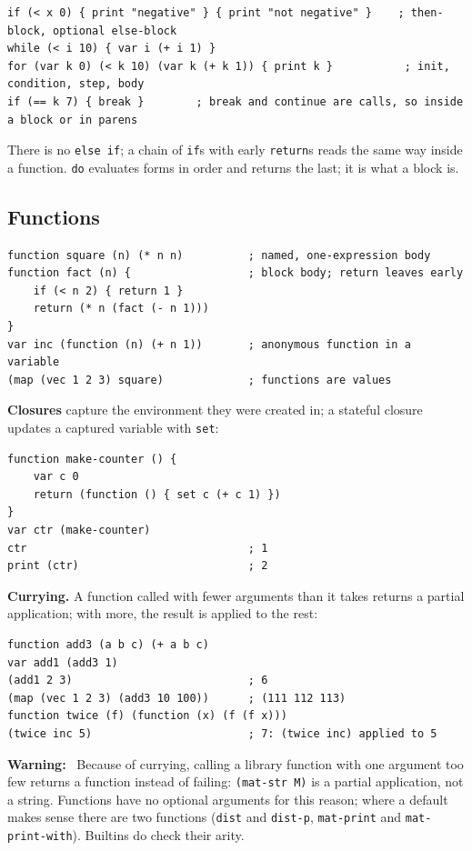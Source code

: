 \documentclass[11pt,a4paper]{article}
\newcommand{\musil}[1]{\lstinline[style=musilinline]{#1}}
\newenvironment{warn}{\begin{mdframed}[backgroundcolor=red!6,linecolor=musilred,linewidth=0.8pt]\textbf{Warning:}\ }{\end{mdframed}}
\begin{document}
\begin{lstlisting}
if (< x 0) { print "negative" } { print "not negative" }    ; then-block, optional else-block
while (< i 10) { var i (+ i 1) }
for (var k 0) (< k 10) (var k (+ k 1)) { print k }           ; init, condition, step, body
if (== k 7) { break }        ; break and continue are calls, so inside a block or in parens
\end{lstlisting}

There is no \texttt{else if}; a chain of \musil{if}s with early \musil{return}s reads
the same way inside a function. \musil{do} evaluates forms in order and returns the
last; it is what a block is.

\subsection{Functions}

\begin{lstlisting}
function square (n) (* n n)          ; named, one-expression body
function fact (n) {                  ; block body; return leaves early
    if (< n 2) { return 1 }
    return (* n (fact (- n 1)))
}
var inc (function (n) (+ n 1))       ; anonymous function in a variable
(map (vec 1 2 3) square)             ; functions are values
\end{lstlisting}

\textbf{Closures} capture the environment they were created in; a stateful closure
updates a captured variable with \musil{set}:

\begin{lstlisting}
function make-counter () {
    var c 0
    return (function () { set c (+ c 1) })
}
var ctr (make-counter)
ctr                                  ; 1
print (ctr)                          ; 2
\end{lstlisting}

\textbf{Currying.} A function called with fewer arguments than it takes returns a
partial application; with more, the result is applied to the rest:

\begin{lstlisting}
function add3 (a b c) (+ a b c)
var add1 (add3 1)
(add1 2 3)                           ; 6
(map (vec 1 2 3) (add3 10 100))      ; (111 112 113)
function twice (f) (function (x) (f (f x)))
(twice inc 5)                        ; 7: (twice inc) applied to 5
\end{lstlisting}

\begin{warn}
Because of currying, calling a library function with one argument too few returns a
function instead of failing: \musil{(mat-str M)} is a partial application, not a
string. Functions have no optional arguments for this reason; where a default makes
sense there are two functions (\musil{dist} and \musil{dist-p}, \musil{mat-print}
and \musil{mat-print-with}). Builtins do check their arity.
\end{warn}
\end{document}
